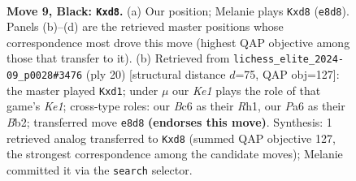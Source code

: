 \documentclass[11pt]{article}
\begin{document}
\clearpage

\begin{figure}[p]\centering
\begin{subfigure}{0.46\textwidth}\centering
\resizebox{\linewidth}{!}{%
\newchessgame
\chessboard[
  setfen={rn1Qkb1r/1p3ppp/p1b1pn2/2P5/P1B5/4PN2/1P3PPP/RNB2RK1 b kq - 0 9},
  showmover=false,
  pgfstyle=straightmove, color=movearrow, markmove={e8-d8}
]}
\caption{}
\end{subfigure}\hfill
\begin{subfigure}{0.46\textwidth}\centering
\resizebox{\linewidth}{!}{%
\newchessgame
\chessboard[
  setfen={r1b2rk1/pp2bppp/2n1pn2/8/1PB5/P3PN2/1B3PPP/RN1qK2R w KQ - 0 11},
  showmover=false,
  pgfstyle=straightmove, color=movearrow, markmove={e1-d1}
]}
\caption{}
\end{subfigure}
\\[4pt]

\caption{\textbf{Move 9, Black: \texttt{Kxd8}.} (a) Our position; Melanie plays \texttt{Kxd8} (\texttt{e8d8}). Panels (b)--(d) are the retrieved master positions whose correspondence most drove this move (highest QAP objective among those that transfer to it). (b) Retrieved from \texttt{lichess\_elite\_2024-09\_p0028\#3476} (ply 20) [structural distance $d$=75, QAP obj=127]: the master played \texttt{Kxd1}; under $\mu$ our \emph{Ke1} plays the role of that game's \emph{Ke1}; cross-type roles: our \emph{B}c6 as their \emph{R}h1, our \emph{P}a6 as their \emph{B}b2; transferred move \texttt{e8d8} \textbf{(endorses this move)}. Synthesis: 1 retrieved analog transferred to \texttt{Kxd8} (summed QAP objective 127, the strongest correspondence among the candidate moves); Melanie committed it via the \texttt{search} selector.}
\label{fig:thought-m17}
\end{figure}

\clearpage
\end{document}
